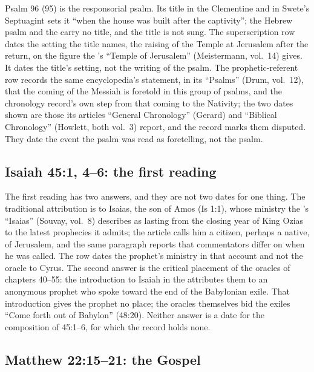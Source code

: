 Psalm 96 (95) is the responsorial psalm. Its title in the Clementine and in
Swete's Septuagint sets it ``when the house was built after the captivity'';
the Hebrew psalm and the  carry no title, and the title is
not sung. The superscription row dates the setting the title names, the
raising of the Temple at Jerusalem after the return, on the figure the
's ``Temple of Jerusalem'' (Meistermann, vol.~14)
gives. It dates the title's setting, not the writing of the psalm. The
prophetic-referent row records the same encyclopedia's statement, in its
``Psalms'' (Drum, vol.~12), that the coming of the Messiah is foretold in this
group of psalms, and the chronology record's own step from that coming to the
Nativity; the two dates shown are those its articles ``General Chronology''
(Gerard) and ``Biblical Chronology'' (Howlett, both vol.~3) report, and the
record marks them disputed. They date the event the psalm was read as
foretelling, not the psalm.

\subsection{Isaiah 45:1, 4--6: the first reading}
\label{sec:date-isaiah}

The first reading has two answers, and they are not two dates for one thing.
The traditional attribution is to Isaias, the son of Amos (Is 1:1), whose
ministry the 's ``Isaias'' (Souvay, vol.~8)
describes as lasting from the closing year of King Ozias to the latest
prophecies it admits; the article calls him a citizen, perhaps a native, of
Jerusalem, and the same paragraph reports that commentators differ on when he
was called. The row dates the prophet's ministry in that account and not the
oracle to Cyrus. The second answer is the critical placement of the oracles of
chapters 40--55: the introduction to Isaiah in the  attributes them to an anonymous prophet who spoke toward the
end of the Babylonian exile. That introduction gives the prophet no place; the
oracles themselves bid the exiles ``Come forth out of Babylon'' (48:20).
Neither answer is a date for the composition of 45:1--6, for which the record
holds none.

\subsection{Matthew 22:15--21: the Gospel}
\label{sec:date-matthew}


